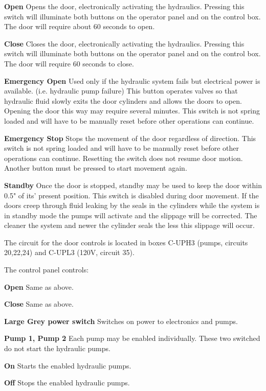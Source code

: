 \begin{description}
\item{\bf Open} Opens the door, electronically activating the hydraulics.
Pressing this switch will illuminate both buttons on the operator panel and
on the
control box. The door will require about 60 seconds to open.
\item{\bf Close} Closes the door, electronically activating the hydraulics.
Pressing this switch will illuminate both buttons on the operator panel and on
the control box. The door will require 60 seconds to close.
\item{\bf Emergency Open} Used only if the hydraulic system fails but electrical
power is available. (i.e. hydraulic pump failure) This button operates
valves so that hydraulic fluid slowly exits the door cylinders and allows the
doors to open. Opening the door this way may require several minutes.
This switch is not spring loaded and will have to be manually reset before
other operations can continue.
\item{\bf Emergency Stop} Stops the movement of the door regardless of
direction.
This switch is not spring loaded and will have to be manually reset before
other operations can continue. Resetting the switch does not resume door
motion. Another button must be pressed to start movement again.
\item{\bf Standby} Once the door is stopped, standby may be used to keep
the door
within 0.5" of its' present position. This switch is disabled during door
movement. If the doors creep through fluid leaking by the seals in the
cylinders while the system is in standby mode the pumps will activate and the
slippage will be corrected. The cleaner the system and newer the cylinder
seals the less this slippage will occur.
\end{description}

The circuit for the door controls is located in boxes C-UPH3 (pumps, circuits
20,22,24) and C-UPL3 (120V, circuit 35).

The control panel controls:

\begin{description}
\item{\bf Open} Same as above.
\item{\bf Close} Same as above.
\item{\bf Large Grey power switch} Switches on power to electronics and pumps.
\item{\bf Pump 1, Pump 2} Each pump may be enabled individually. These two
switched do not start the hydraulic pumps.
\item{\bf On} Starts the enabled hydraulic pumps.
\item{\bf Off} Stops the enabled hydraulic pumps.
\end{description}

